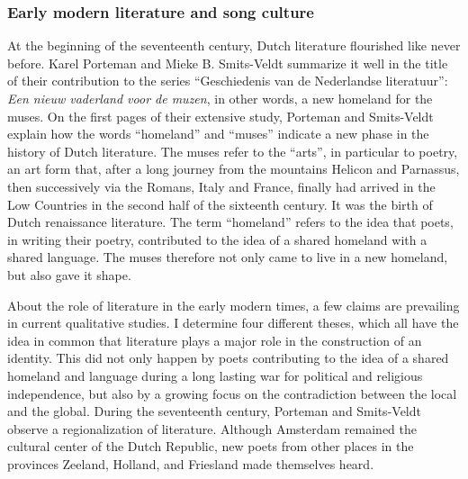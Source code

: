 \subsubsection{Early modern literature and song culture}
At the beginning of the seventeenth century, Dutch literature flourished like never before. Karel Porteman and Mieke B. Smits-Veldt summarize it well in the title of their contribution to the series \enquote{Geschiedenis van de Nederlandse literatuur}: \textit{Een nieuw vaderland voor de muzen}, in other words, a new homeland for the muses. On the first pages of their extensive study, Porteman and Smits-Veldt explain how the words \enquote{homeland} and \enquote{muses} indicate a new phase in the history of Dutch literature. The muses refer to the \enquote{arts}, in particular to poetry, an art form that, after a long journey from the mountains Helicon and Parnassus, then successively via the Romans, Italy and France, finally had arrived in the Low Countries in the second half of the sixteenth century. It was the birth of Dutch renaissance literature.\autocite[17]{porteman_een_2009} The term \enquote{homeland} refers to the idea that poets, in writing their poetry, contributed to the idea of a shared homeland with a shared language. The muses therefore not only came to live in a new homeland, but also gave it shape.\autocite[18]{porteman_een_2009}

About the role of literature in the early modern times, a few claims are prevailing in current qualitative studies. I determine four different theses, which all have the idea in common that literature plays a major role in the construction of an identity. This did not only happen by poets contributing to the idea of a shared homeland and language during a long lasting war for political and religious independence, but also by a growing focus on the contradiction between the local and the global. During the seventeenth century, Porteman and Smits-Veldt observe a regionalization of literature. Although Amsterdam remained the cultural center of the Dutch Republic, new poets from other places in the provinces Zeeland, Holland, and Friesland made themselves heard.\autocite[21]{porteman_een_2009} 

